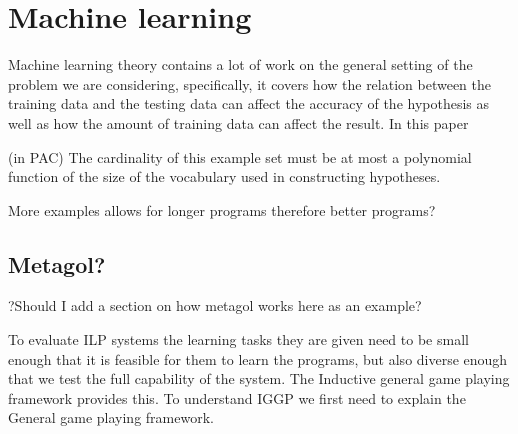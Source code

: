 \section{Machine learning}
Machine learning theory contains a lot of work on the general setting of the problem we are considering, specifically, it covers how the relation between the training data and the testing data can affect the accuracy of the hypothesis as well as how the amount of training data can affect the result. In this paper

(in PAC) The cardinality of this example set must be at most a polynomial function of the size of the vocabulary used in constructing hypotheses.

More examples allows for longer programs therefore better programs?



\subsection{Metagol?}
?Should I add a section on how metagol works here as an example?


To evaluate ILP systems the learning tasks they are given need to be small enough that it is feasible for them to learn the programs, but also diverse enough that we test the full capability of the system. The Inductive general game playing framework provides this. To understand IGGP we first need to explain the General game playing framework.


